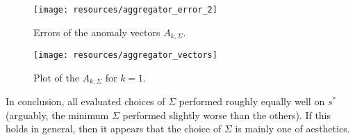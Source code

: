\begin{figure}[!ht]
    \begin{center}
        \texttt{[image: resources/aggregator\_error\_2]}
    \end{center}
    \caption{\small{Errors of the anomaly vectors $A_{k, \Sigma}$.}}
\label{fig:aggregator_error}
\end{figure}

\begin{wrapfigure}{r}{0.49\textwidth}
\changecaptionwidth
{}
\texttt{[image: resources/aggregator\_vectors]}
\caption{\small{Plot of the $A_{k, \Sigma}$ for $k=1$.}}
\label{fig:aggregator_vectors}
\end{wrapfigure}

In conclusion, all evaluated choices of $\Sigma$ performed roughly equally well on $s^*$ (arguably, the minimum $\Sigma$ performed slightly worse than the others). If this holds in general, then it appears that the choice of $\Sigma$ is mainly one of aesthetics.
